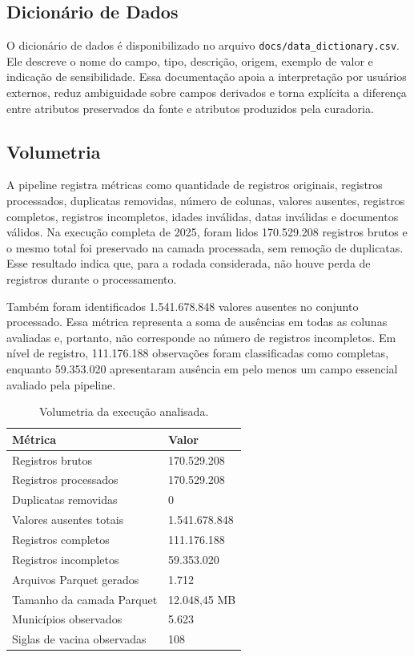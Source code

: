 \documentclass[12pt]{article}
\begin{document}
\subsection{Dicionário de Dados}

O dicionário de dados é disponibilizado no arquivo \texttt{docs/data\_dictionary.csv}. Ele descreve o nome do campo, tipo, descrição, origem, exemplo de valor e indicação de sensibilidade. Essa documentação apoia a interpretação por usuários externos, reduz ambiguidade sobre campos derivados e torna explícita a diferença entre atributos preservados da fonte e atributos produzidos pela curadoria.

\subsection{Volumetria}

A pipeline registra métricas como quantidade de registros originais, registros processados, duplicatas removidas, número de colunas, valores ausentes, registros completos, registros incompletos, idades inválidas, datas inválidas e documentos válidos. Na execução completa de 2025, foram lidos 170.529.208 registros brutos e o mesmo total foi preservado na camada processada, sem remoção de duplicatas. Esse resultado indica que, para a rodada considerada, não houve perda de registros durante o processamento.

Também foram identificados 1.541.678.848 valores ausentes no conjunto processado. Essa métrica representa a soma de ausências em todas as colunas avaliadas e, portanto, não corresponde ao número de registros incompletos. Em nível de registro, 111.176.188 observações foram classificadas como completas, enquanto 59.353.020 apresentaram ausência em pelo menos um campo essencial avaliado pela pipeline.

\begin{table}[ht]
\centering
\caption{Volumetria da execução analisada.}
\label{tab:volumetry}
\begin{tabular}{p{6.3cm}p{4.5cm}}
\toprule
\textbf{Métrica} & \textbf{Valor} \\
\midrule
Registros brutos & 170.529.208 \\
Registros processados & 170.529.208 \\
Duplicatas removidas & 0 \\
Valores ausentes totais & 1.541.678.848 \\
Registros completos & 111.176.188 \\
Registros incompletos & 59.353.020 \\
Arquivos Parquet gerados & 1.712 \\
Tamanho da camada Parquet & 12.048,45 MB \\
Municípios observados & 5.623 \\
Siglas de vacina observadas & 108 \\
\bottomrule
\end{tabular}
\end{table}
\end{document}
